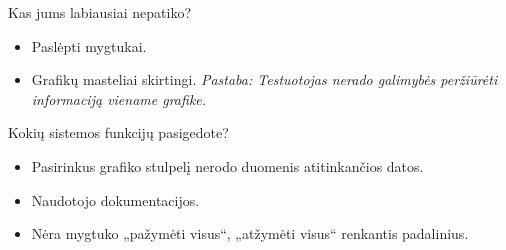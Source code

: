 Kas jums labiausiai nepatiko?
\begin{itemize}
  \item Paslėpti mygtukai.
  \item Grafikų masteliai skirtingi. \emph{Pastaba: Testuotojas
    nerado galimybės peržiūrėti informaciją viename grafike.}
\end{itemize}

Kokių sistemos funkcijų pasigedote?
\begin{itemize}
  \item Pasirinkus grafiko stulpelį nerodo duomenis atitinkančios datos.
  \item Naudotojo dokumentacijos.
  \item Nėra mygtuko „pažymėti visus“, „atžymėti visus“ renkantis
    padalinius.
\end{itemize}
